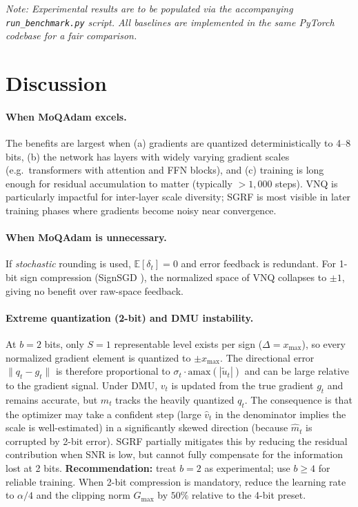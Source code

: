 \documentclass[10pt,twocolumn]{article}
\begin{document}
\textit{Note: Experimental results are to be populated via the
accompanying \texttt{run\_benchmark.py} script.  All baselines are
implemented in the same PyTorch codebase for a fair comparison.}

\section{Discussion}

\paragraph{When MoQAdam excels.}
The benefits are largest when (a) gradients are quantized deterministically
to 4--8 bits, (b) the network has layers with widely varying gradient
scales (e.g.\ transformers with attention and FFN blocks), and (c)
training is long enough for residual accumulation to matter
(typically $>1{,}000$ steps).  VNQ is particularly impactful for
inter-layer scale diversity; SGRF is most visible in later training
phases where gradients become noisy near convergence.

\paragraph{When MoQAdam is unnecessary.}
If \emph{stochastic} rounding is used, $\mathbb{E}[\delta_t] = 0$ and
error feedback is redundant.  For 1-bit sign compression
(SignSGD \cite{bernstein2018signsgd}), the normalized space of VNQ
collapses to $\pm 1$, giving no benefit over raw-space feedback.

\paragraph{Extreme quantization (2-bit) and DMU instability.}
At $b = 2$ bits, only $S = 1$ representable level exists per sign
($\Delta = x_{\max}$), so every normalized gradient element is
quantized to $\pm x_{\max}$.  The directional error $\|q_t - g_t\|$
is therefore proportional to $\sigma_t \cdot \mathrm{amax}(|\tilde{u}_t|)$
and can be large relative to the gradient signal.  Under DMU, $v_t$ is
updated from the true gradient $g_t$ and remains accurate, but $m_t$
tracks the heavily quantized $q_t$.  The consequence is that the
optimizer may take a confident step (large $\hat{v}_t$ in the
denominator implies the scale is well-estimated) in a significantly
skewed direction (because $\hat{m}_t$ is corrupted by 2-bit error).
SGRF partially mitigates this by reducing the residual contribution
when SNR is low, but cannot fully compensate for the information lost
at 2 bits.  \textbf{Recommendation:} treat $b = 2$ as experimental;
use $b \ge 4$ for reliable training.  When 2-bit compression is
mandatory, reduce the learning rate to $\alpha / 4$ and the clipping
norm $G_{\max}$ by $50\%$ relative to the 4-bit preset.
\end{document}
